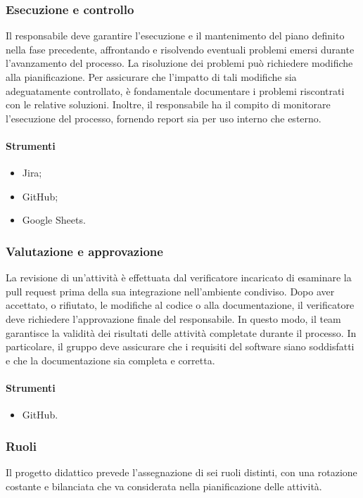 \subsubsection{Esecuzione e controllo}
\par Il responsabile deve garantire l'esecuzione e il mantenimento del piano definito nella fase precedente, affrontando e risolvendo eventuali problemi emersi durante l'avanzamento del processo. La risoluzione dei problemi può richiedere modifiche alla pianificazione. Per assicurare che l'impatto di tali modifiche sia adeguatamente controllato, è fondamentale documentare i problemi riscontrati con le relative soluzioni. Inoltre, il responsabile ha il compito di monitorare l'esecuzione del processo, fornendo report sia per uso interno che esterno.

\paragraph*{Strumenti}
\begin{itemize}
  \item Jira;
  \item GitHub;
  \item Google Sheets.
\end{itemize}

\subsubsection{Valutazione e approvazione}
\par La revisione di un'attività è effettuata dal verificatore incaricato di esaminare la pull request prima della sua integrazione nell'ambiente condiviso. Dopo aver accettato, o rifiutato, le modifiche al codice o alla documentazione, il verificatore deve richiedere l'approvazione finale del responsabile. In questo modo, il team garantisce la validità dei risultati delle attività completate durante il processo. In particolare, il gruppo deve assicurare che i requisiti del software siano soddisfatti e che la documentazione sia completa e corretta.

\paragraph*{Strumenti}
\begin{itemize}
  \item GitHub.
\end{itemize}

\subsubsection{Ruoli}
\par Il progetto didattico prevede l'assegnazione di sei ruoli distinti, con una rotazione costante e bilanciata che va considerata nella pianificazione delle attività.

